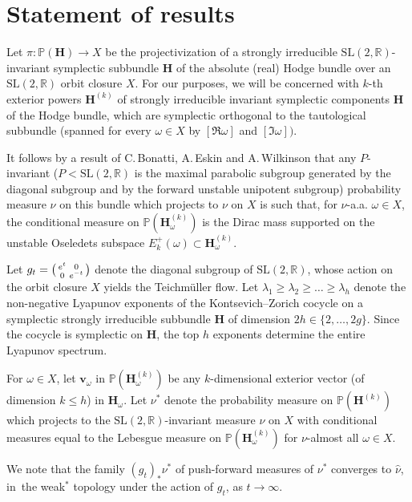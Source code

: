 \documentclass[JEP,XML,SOM,Unicode,published]{cedram}
\newenvironment{smallpmatrix}{\big(\begin{smallmatrix}}{\end{smallmatrix}\big)}
\theoremstyle{plain}
\theoremstyle{definition}
\numberwithin{equation}{subsection}
\newcommand\bP{\mathbb{P}}
\newcommand\bR{\mathbb{R}}\let\R\bR
\newcommand{\SL}{\mathrm{SL}}
\newcommand{\bfH}{\boldsymbol{H}}
\newcommand{\bfv}{\boldsymbol{v}}
\begin{document}
\section{Statement of results}\label{statement}

Let $\pi: \bP(\bfH) \to X$ be the projectivization of a strongly irreducible $\SL(2,\bR)$-invariant symplectic subbundle $\bfH$ of the absolute (real) Hodge bundle over an $\SL(2,\bR)$ orbit closure $X$. For our purposes, we will be concerned with $k$-th exterior powers $\bfH^{(k)}$ of strongly irreducible invariant symplectic components $\bfH$ of the Hodge bundle, which are symplectic orthogonal to the tautological subbundle (spanned for every $\omega \in X $ by $[\Re \omega]$ and $[\Im \omega])$.

It follows by a result of C.\,Bonatti, A.\,Eskin and A.\,Wilkinson \cite{BEW20} that any $P$\nobreakdash-invariant ($P<\SL(2,\R)$ is the maximal parabolic subgroup generated by the diagonal subgroup and by the forward unstable unipotent subgroup) probability measure $\hat{\nu}$ on this bundle which projects to $\nu$ on $X$ is such that, for $\nu$-a.a. $\omega\in X$, the conditional measure on $\bP (\bfH^{(k)}_\omega)$ is the Dirac mass supported on the unstable Oseledets subspace \hbox{$E^+_k(\omega)\subset \bfH^{(k)}_\omega$}.

Let $g_t=\begin{smallpmatrix}e^{t}&0\\0&e^{-t}\end{smallpmatrix}$ denote the diagonal subgroup of $\SL(2,\bR)$, whose action on the orbit closure $X$ yields the Teichmüller flow.
Let $\lambda_1\geq \lambda_2 \geq \dots \geq \lambda_h$ denote the non-negative Lyapunov exponents of the Kontsevich--Zorich cocycle on a symplectic strongly irreducible subbundle
$\bfH$ of dimension $2h\in \{2,\dots, 2g\}$. Since the cocycle is symplectic on $\bfH$, the top $h$ exponents determine the entire Lyapunov spectrum.

For $\omega\in X$, let $\bfv_\omega$ in $\bP (\bfH^{(k)}_\omega)$ be any $k$-dimensional exterior vector (of dimension $k\leq h$) in $\bfH_\omega$. Let $\nu^*$ denote the probability measure on $\bP (\bfH^{(k)})$ which projects to the $\SL(2,\R)$-invariant
measure $\nu$ on $X$ with conditional measures equal to the
Lebesgue measure on $\bP (\bfH^{(k)}_\omega)$ for $\nu$-almost all $\omega \in X$.

We note that the family \((g_t)_{\ast}\nu^{\ast}\) of push-forward measures of \(\nu^{\ast}\) converges to $\hat \nu$, in~the weak\(^\ast\) topology under the action of \(g_t\), as $t\to\infty$.
\end{document}
